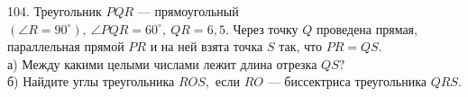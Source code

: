 104. Треугольник $PQR$ --- прямоугольный $(\angle R=90^\circ),\ \angle PQR=60^\circ,\ QR=6,5.$ Через точку $Q$ проведена прямая, параллельная прямой $PR$ и на ней взята точка $S$ так, что $PR=QS.$\\
а) Между какими целыми числами лежит длина отрезка $QS?$\\
б) Найдите углы треугольника $ROS,$ если $RO$ --- биссектриса треугольника $QRS.$\\
